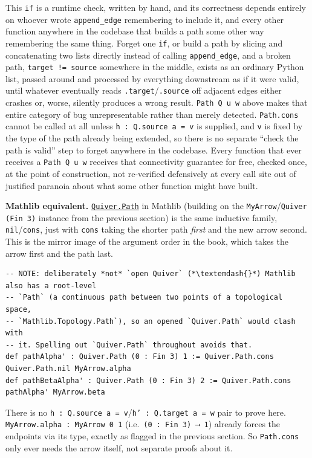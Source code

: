 This \texttt{if} is a runtime check, written by hand, and its correctness depends entirely on whoever wrote \texttt{append\_\allowbreak{}edge} remembering to include it, and every other function anywhere in the codebase that builds a path some other way remembering the same thing. Forget one \texttt{if}, or build a path by slicing and concatenating two lists directly instead of calling \texttt{append\_\allowbreak{}edge}, and a broken path, \texttt{target != source} somewhere in the middle, exists as an ordinary Python list, passed around and processed by everything downstream as if it were valid, until whatever eventually reads \texttt{.target}/\texttt{.source} off adjacent edges either crashes or, worse, silently produces a wrong result. \texttt{Path Q u w} above makes that entire category of bug unrepresentable rather than merely detected. \texttt{Path.cons} cannot be called at all unless \texttt{h : Q.source a = v} is supplied, and \texttt{v} is fixed by the type of the path already being extended, so there is no separate ``check the path is valid'' step to forget anywhere in the codebase. Every function that ever receives a \texttt{Path Q u w} receives that connectivity guarantee for free, checked once, at the point of construction, not re-verified defensively at every call site out of justified paranoia about what some other function might have built.

\textbf{Mathlib equivalent.} \href{https://loogle.lean-lang.org/?q=Quiver.Path}{\texttt{Quiver.Path}} in Mathlib (building on the \texttt{MyArrow}/\texttt{Quiver (Fin 3)} instance from the previous section) is the same inductive family, \texttt{nil}/\texttt{cons}, just with \texttt{cons} taking the shorter path \emph{first} and the new arrow second. This is the mirror image of the argument order in the book, which takes the arrow first and the path last.

\begin{lstlisting}
-- NOTE: deliberately *not* `open Quiver` (*\textemdash{}*) Mathlib also has a root-level
-- `Path` (a continuous path between two points of a topological space,
-- `Mathlib.Topology.Path`), so an opened `Quiver.Path` would clash with
-- it. Spelling out `Quiver.Path` throughout avoids that.
def pathAlpha' : Quiver.Path (0 : Fin 3) 1 := Quiver.Path.cons Quiver.Path.nil MyArrow.alpha
def pathBetaAlpha' : Quiver.Path (0 : Fin 3) 2 := Quiver.Path.cons pathAlpha' MyArrow.beta
\end{lstlisting}

There is no \texttt{h : Q.source a = v}/\texttt{h' : Q.target a = w} pair to prove here. \texttt{MyArrow.alpha : MyArrow 0 1} (i.e.~\texttt{(0 : Fin 3) ⟶ 1}) already forces the endpoints via its type, exactly as flagged in the previous section. So \texttt{Path.cons} only ever needs the arrow itself, not separate proofs about it.
